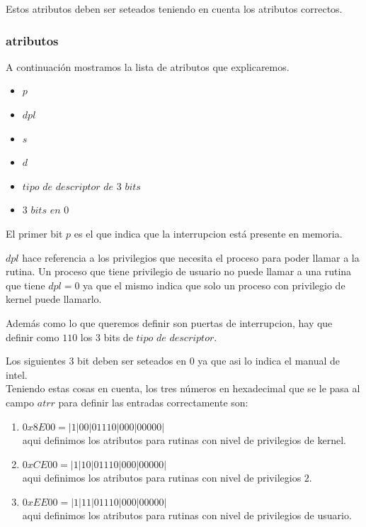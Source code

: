 \documentclass[a4paper,10pt,twoside]{article}
\begin{document}
Estos atributos deben ser seteados teniendo en cuenta los atributos correctos.

\subsubsection{atributos}

A continuación mostramos la lista de atributos que explicaremos.
\begin{itemize}
 \item $p$
 \item $dpl$
 \item $s$
 \item $d$
 \item $tipo$ $de$ $descriptor$ $de$ $3$ $bits$
 \item $3$ $bits$ $en$ $0$
\end{itemize}

El primer bit $p$ es el que indica que la interrupcion está presente en memoria.

$dpl$ hace referencia a los privilegios que necesita el proceso para poder llamar a la rutina. Un proceso que tiene privilegio de usuario no puede llamar a una rutina que tiene $dpl = 0$ ya que el mismo indica que solo un proceso con privilegio de kernel puede llamarlo.

Además como lo que queremos definir son puertas de interrupcion, hay que definir como $1 1 0$ los 3 bits de $tipo$ $de$ $descriptor$.

Los siguientes 3 bit deben ser seteados en $0$ ya que asi lo indica el manual de intel.\\

Teniendo estas cosas en cuenta, los tres números en hexadecimal que se le pasa al campo $atrr$ para definir las entradas correctamente son:

\begin{enumerate}
 \item $0x8E00 = | 1 | 0 0 | 0 1 1 1 0 | 0 0 0 | 0 0 0 0 0 | $ \\ aqui definimos los atributos para rutinas con nivel de privilegios de kernel.
 \item $0xCE00 = | 1 | 1 0 | 0 1 1 1 0 | 0 0 0 | 0 0 0 0 0 | $ \\ aqui definimos los atributos para rutinas con nivel de privilegios $2$.
 \item $0xEE00 = | 1 | 1 1 | 0 1 1 1 0 | 0 0 0 | 0 0 0 0 0 | $ \\ aqui definimos los atributos para rutinas con nivel de privilegios de usuario.
\end{enumerate}
\end{document}
